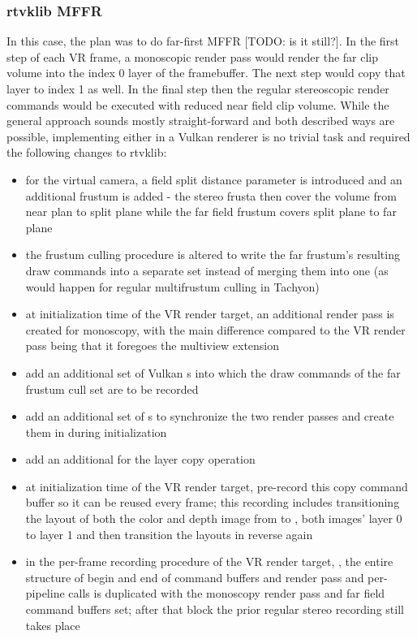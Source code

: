 \subsubsection{rtvklib MFFR}
In this case, the plan was to do far-first MFFR [TODO: is it still?]. In the first step of each VR frame, a monoscopic render pass would render the far clip volume into the index 0 layer of the framebuffer. The next step would copy that layer to index 1 as well. In the final step then the regular stereoscopic render commands would be executed with reduced near field clip volume. 
While the general approach sounds mostly straight-forward and both described ways are possible, implementing either in a Vulkan renderer is no trivial task and required the following changes to rtvklib: 
\begin{itemize}
\item for the virtual camera, a field split distance parameter is introduced and an additional frustum is added - the stereo frusta then cover the volume from near plan to split plane while the far field frustum covers split plane to far plane
\item the frustum culling procedure is altered to write the far frustum's resulting draw commands into a separate set instead of merging them into one (as would happen for regular multifrustum culling in Tachyon)
\item at initialization time of the VR render target, an additional render pass is created for monoscopy, with the main difference compared to the VR render pass being that it foregoes the multiview extension
\item add an additional set of Vulkan s into which the draw commands of the far frustum cull set are to be recorded
\item add an additional set of s to synchronize the two render passes and create them in  during initialization
\item add an additional  for the layer copy operation
\item at initialization time of the VR render target, pre-record this copy command buffer so it can be reused every frame; this recording includes transitioning the layout of both the color and depth image from  to ,  both images' layer 0 to layer 1 and then transition the layouts in reverse again
\item in the per-frame recording procedure of the VR render target, , the entire structure of begin and end of command buffers and render pass and per-pipeline  calls is duplicated with the monoscopy render pass and far field command buffers set; after that block the prior regular stereo recording still takes place

\end{itemize}
